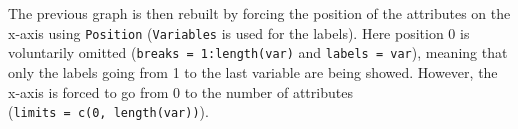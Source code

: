 \documentclass[
]{book}
\newenvironment{Shaded}{\begin{snugshade}}{\end{snugshade}}
\newcommand{\AttributeTok}[1]{\textcolor[rgb]{0.77,0.63,0.00}{#1}}
\newcommand{\DecValTok}[1]{\textcolor[rgb]{0.00,0.00,0.81}{#1}}
\newcommand{\FunctionTok}[1]{\textcolor[rgb]{0.00,0.00,0.00}{#1}}
\newcommand{\NormalTok}[1]{#1}
\newcommand{\OtherTok}[1]{\textcolor[rgb]{0.56,0.35,0.01}{#1}}
\newcommand{\SpecialCharTok}[1]{\textcolor[rgb]{0.00,0.00,0.00}{#1}}
\newcommand{\StringTok}[1]{\textcolor[rgb]{0.31,0.60,0.02}{#1}}
\begin{document}
\begin{Shaded}
\end{Shaded}

The previous graph is then rebuilt by forcing the position of the attributes on the x-axis using \texttt{Position} (\texttt{Variables} is used for the labels). Here position 0 is voluntarily omitted (\texttt{breaks\ =\ 1:length(var)} and \texttt{labels\ =\ var}), meaning that only the labels going from 1 to the last variable are being showed. However, the x-axis is forced to go from 0 to the number of attributes (\texttt{limits\ =\ c(0,\ length(var))}).
\end{document}
